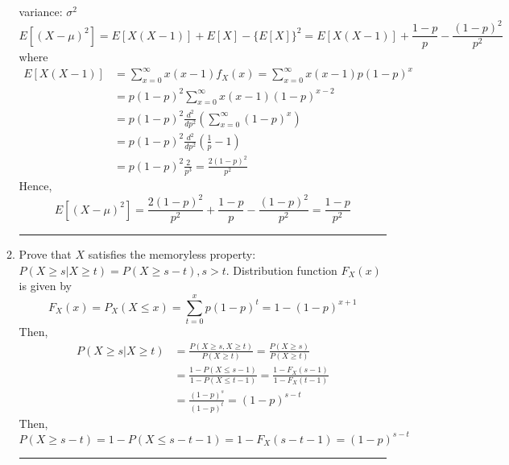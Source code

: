 \documentclass[twoside]{article}
\theoremstyle{definition}
\theoremstyle{remark}
\newenvironment{sol}{{\bf Solution:}}{\hfill\rule{2mm}{2mm}}
\begin{document}
\begin{enumerate}
\begin{enumerate}
\begin{sol}
      variance: $\sigma^2$
      \begin{equation}
        E[{(X-\mu)}^2] = E[X(X-1)] + E[X] - {\{E[X]\}}^2 = E[X(X-1)] + \frac{1-p}{p} - \frac{{(1-p)}^2}{p^2}
      \end{equation}
      where
      \begin{equation}
        \begin{split}
          E[X(X-1)]
          &= \sum_{x=0}^\infty x(x-1) f_X(x)
           = \sum_{x=0}^\infty x(x-1) p{(1-p)}^x \\
          &= p{(1-p)}^2 \sum_{x=0}^\infty x(x-1) {(1-p)}^{x-2} \\
          &= p{(1-p)}^2 \frac{d^2}{dp^2}\left(\sum_{x=0}^\infty {(1-p)}^x \right) \\
          &= p{(1-p)}^2 \frac{d^2}{dp^2}\left(\frac{1}{p} -1 \right) \\
          &= p{(1-p)}^2 \frac{2}{p^3} = \frac{2{(1-p)}^2}{p^2}
        \end{split}
      \end{equation}
      Hence,
      \begin{equation}
        E[{(X-\mu)}^2] = \frac{2{(1-p)}^2}{p^2} + \frac{1-p}{p} - \frac{{(1-p)}^2}{p^2} = \frac{1 - p}{p^2}
      \end{equation}
    \end{sol}
    \item Prove that $X$ satisfies the memoryless property: $P(X \geq s | X \geq t) = P(X \geq s - t), s > t$.
    \begin{sol}
      Distribution function $F_X(x)$ is given by
      \begin{equation}
        F_X(x) = P_X(X \leq x) = \sum_{t=0}^{x} p{(1-p)}^t = 1 - {(1-p)}^{x+1}
      \end{equation}
      Then,
      \begin{equation}
        \begin{split}
          P(X \geq s|X \geq t)
          &= \frac{P(X \geq s, X \geq t)}{P(X \geq t)} = \frac{P(X \geq s)}{P(X \geq t)} \\
          &= \frac{1 - P(X \leq s-1)}{1 - P(X \leq t-1)} = \frac{1 - F_X(s-1)}{1 - F_X(t-1)} \\
          &= \frac{{(1-p)}^{s}}{{(1-p)}^{t}} = {(1-p)}^{s-t}
        \end{split}
      \end{equation}
      Then,
      \begin{equation}
        P(X \geq s-t) = 1 - P(X \leq s-t-1) = 1 - F_X(s-t-1) = {(1-p)}^{s-t}

\end{equation}
\end{sol}
\end{enumerate}
\end{enumerate}
\end{document}
